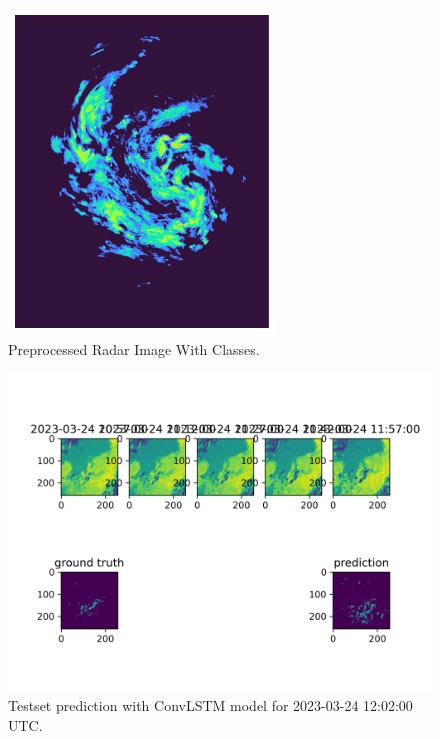 \documentclass[acmtog, screen, balance]{acmart}
\begin{document}
\begin{figure}[hbp]
  \centering
  \includegraphics[width=200pt]{./images/radar_binned.png}
  \caption{Preprocessed Radar Image With Classes.}
  \Description{}
  \label{fig:radar-bin}
\end{figure}

\begin{figure}[hbp]
  \centering
  \includegraphics[width=370pt]{./images/experiment-0.png}
  \caption{Testset prediction with ConvLSTM model for 2023-03-24 12:02:00 UTC.}
  \Description{}
  \label{fig:convclass}
\end{figure}
\end{document}

